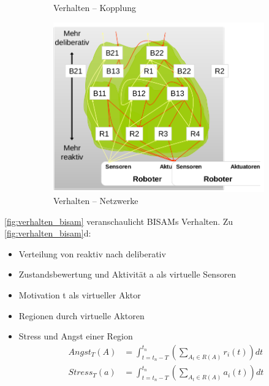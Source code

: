 \begin{figure}
\begin{subfigure}{.5\textwidth}
		\caption{Verhalten -- Kopplung}
	\end{subfigure}
	\begin{subfigure}{.5\textwidth}		
		\centering
		\includegraphics[width=\textwidth]{figures/verhalten_netzwerke.png}
		\caption{Verhalten -- Netzwerke}
	\end{subfigure}
	\caption{}
	\label{fig:verhalten_bisam}
\end{figure}
\autoref{fig:verhalten_bisam} veranschaulicht BISAMs Verhalten.
Zu \autoref{fig:verhalten_bisam}d:
\begin{itemize}
	\item Verteilung von reaktiv nach deliberativ
	\item Zustandsbewertung und Aktivität a als virtuelle Sensoren
	\item Motivation t als virtueller Aktor
	\item Regionen durch virtuelle Aktoren
	\item Stress und Angst einer Region
	\begin{align}	
		Angst_T(A) &= \int_{t = t_n - T}^{t_n} \left( \sum_{A_t \in R(A)} r_i\left(t\right)\right) dt \\
		Stress_T(a) &= \int_{t = t_n - T}^{t_n} \left( \sum_{A_t \in R(A)} a_i\left(t\right)\right) dt
	\end{align}
\end{itemize}

